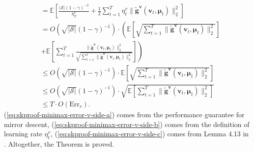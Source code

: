 \documentclass[12pt]{article}
\begin{document}
\begin{subequations}
    \begin{align}
        & = \mathbb{E} \left [ \frac{|\mathcal{S}|(1-\gamma)^{-2}}{\eta_T^v} + \frac{1}{2} \sum_{t=1}^T \eta_t^v \|\tilde{\boldsymbol{g}}^{\boldsymbol{v}}(\boldsymbol{v}_t,\boldsymbol{\mu}_t)\|_2^2\right] \label{eq:skproof-minimax-error-v-side-a}\\
        & = O \left(\sqrt{|\mathcal{S}|} (1-\gamma)^{-1} \right) \cdot \left( \mathbb{E} \left [\sqrt{\sum_{t=1}^T\|\tilde{\boldsymbol{g}}^{\boldsymbol{v}}(\boldsymbol{v}_t,\boldsymbol{\mu}_t)\|_2^2} \right]\right. \nonumber \\
        & + \left. \mathbb{E} \left[\sum_{t=1}^T \frac{\|\tilde{\boldsymbol{g}}^{\boldsymbol{v}}(\boldsymbol{v}_t,\boldsymbol{\mu}_t)\|_2^2}{\sqrt{\sum_{i=1}^t \|\tilde{\boldsymbol{g}}^{\boldsymbol{v}}(\boldsymbol{v}_i,\boldsymbol{\mu}_i)\|_2^2}}  \right]\right) \label{eq:skproof-minimax-error-v-side-b} \\
        & \le O \left( \sqrt{|\mathcal{S}|} (1-\gamma)^{-1} \right) \cdot \mathbb{E} \left[\sqrt{\sum_{t=1}^T\|\tilde{\boldsymbol{g}}^{\boldsymbol{v}}(\boldsymbol{v}_t,\boldsymbol{\mu}_t)\|_2^2} \right ] \label{eq:skproof-minimax-error-v-side-c} \\
        & \le  O \left( \sqrt{|\mathcal{S}|} (1-\gamma)^{-1} \right) \cdot  \sqrt{ \mathbb{E} \left[\sum_{t=1}^T\|\tilde{\boldsymbol{g}}^{\boldsymbol{v}}(\boldsymbol{v}_t,\boldsymbol{\mu}_t)\|_2^2 \right]} \nonumber \\
        & \le T \cdot O \left( \text{Err}_{v} \right). \nonumber
    \end{align}
    \label{eq:skproof-minimax-error-v-side}
\end{subequations}
(\ref{eq:skproof-minimax-error-v-side-a}) comes from the performance guarantee for mirror descent, (\ref{eq:skproof-minimax-error-v-side-b}) comes from the definition of learning rate $\eta_t^v$, (\ref{eq:skproof-minimax-error-v-side-c}) comes from Lemma 4.13 in \cite{orabona2019modern}. Altogether, the Theorem is proved.




\end{document}
